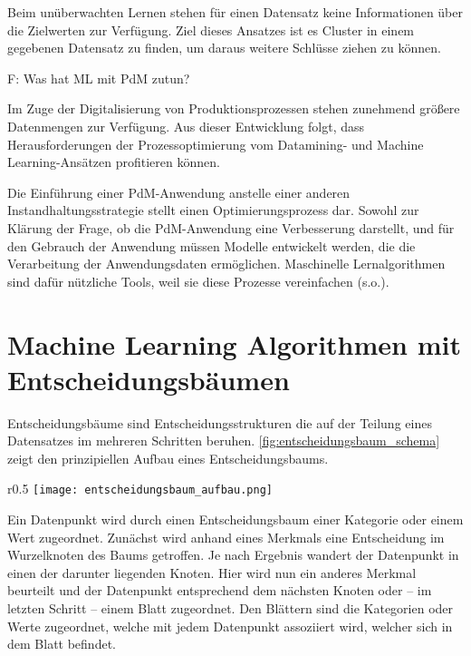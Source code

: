 Beim unüberwachten Lernen stehen für einen Datensatz keine Informationen über die Zielwerten zur Verfügung. Ziel dieses Ansatzes ist es Cluster in einem gegebenen Datensatz zu finden, um daraus weitere Schlüsse ziehen zu können.

F: Was hat ML mit PdM zutun?

Im Zuge der Digitalisierung von Produktionsprozessen stehen zunehmend größere Datenmengen zur Verfügung. Aus dieser Entwicklung folgt, dass Herausforderungen der Prozessoptimierung vom Datamining- und Machine Learning-Ansätzen profitieren können.~\cite[S.~35]{Schafer.25.09.201927.09.2019}

Die Einführung einer PdM-Anwendung anstelle einer anderen Instandhaltungsstrategie stellt einen Optimierungsprozess dar. Sowohl zur Klärung der Frage, ob die PdM-Anwendung eine Verbesserung darstellt, und für den Gebrauch der Anwendung müssen Modelle entwickelt werden, die die Verarbeitung der Anwendungsdaten ermöglichen. Maschinelle Lernalgorithmen sind dafür nützliche Tools, weil sie diese Prozesse vereinfachen (s.o.).
\section{Machine Learning Algorithmen mit Entscheidungsbäumen}
\label{sec:algorithmen_mit_entscheidungsbaum}
Entscheidungsbäume sind Entscheidungsstrukturen die auf der Teilung eines Datensatzes im mehreren Schritten beruhen. \cref{fig:entscheidungsbaum_schema} zeigt den prinzipiellen Aufbau eines Entscheidungsbaums.

\begin{wrapfigure}{r}{0.5\textwidth}
	\centering
	\texttt{[image: entscheidungsbaum\_aufbau.png]}
	\caption{Schematische Darstellung eines Entscheidungsbaums}
	\label{fig:entscheidungsbaum_schema}
\end{wrapfigure}

Ein Datenpunkt wird durch einen Entscheidungsbaum einer Kategorie oder einem Wert zugeordnet. Zunächst wird anhand eines Merkmals eine Entscheidung im Wurzelknoten des Baums getroffen. Je nach Ergebnis wandert der Datenpunkt in einen der darunter liegenden Knoten. Hier wird nun ein anderes Merkmal beurteilt und der Datenpunkt entsprechend dem nächsten Knoten oder -- im letzten Schritt -- einem Blatt zugeordnet. Den Blättern sind die Kategorien oder Werte zugeordnet, welche mit jedem Datenpunkt assoziiert wird, welcher sich in dem Blatt befindet. 

